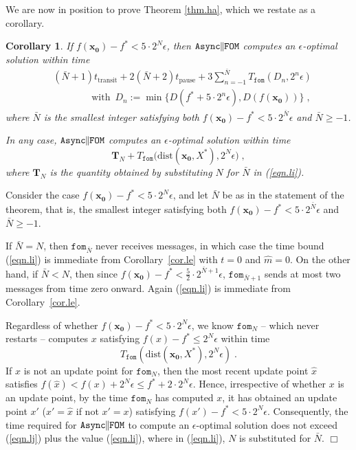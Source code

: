 \documentclass[reqno, 11pt]{amsart}
\newtheorem{cor}[prop]{Corollary}
\numberwithin{equation}{section}
\newcommand{\nt}{\negthinspace}
\newcommand{\fom}{\mathtt{fom}}
\newcommand{\parfom}{\parallel \nt \nt  \mathtt{FOM}}
\newcommand{\tpause}{t_{\mathrm{pause}}}
\newcommand{\ttransit}{t_{\mathrm{transit}}}
\newcommand{\aparfom}{\mathtt{Async} \nt \nt \parfom}
\newcommand{\dist}{\mathrm{dist}}
\begin{document}
We are now in position to prove Theorem \ref{thm.ha}, which we restate as a corollary.

\begin{cor}   \label{cor.lf} 
If $ f(\mathbf{x_0}) - f^* < 5 \cdot 2^N \epsilon $, then $ \aparfom $ computes an $ \epsilon $-optimal solution within time
\begin{align} 
  & (\bar{N}+1) \ttransit + 2(\bar{N}+2) \tpause +  3 \sum_{n=-1}^{\bar{N}}  T_{\fom}\left(   D_n , 2^n \epsilon \right)  \label{eqn.li}    \\   
& \qquad \qquad   \textrm{with } \,    D_n :=   \min \{ D(f^* + 5 \cdot 2^n \epsilon), D( f( \mathbf{x_0})) \}  \; , \nonumber 
\end{align}   
where $ \bar{N} $ is the smallest integer satisfying both $ f(\mathbf{x_0}) - f^* < 5 \cdot 2^{\bar{N}} \epsilon $ and $ \bar{N} \geq -1 $.

In any case, $ \aparfom $ computes an $ \epsilon $-optimal solution within time
\[ 
\mathbf{T}_N + 
  T_{\fom}\big( \dist( \mathbf{x_0}, X^*), 2^{N} \epsilon \big)   \; , 
\]  
 where $ \mathbf{T}_N  $ is the quantity obtained by substituting $ N $ for $ \bar{N} $ in (\ref{eqn.li}).
\end{cor}
  Consider the case $ f( \mathbf{x_0}) - f^* < 5 \cdot 2^N  \epsilon $, and let $ \bar{N} $ be as in the statement of the theorem, that is, the smallest integer satisfying both $ f( \mathbf{x_0}) - f^* < 5 \cdot 2^{\bar{N}}  \epsilon $ and $ \bar{N} \geq -1 $. 

If $ \bar{N} = N $, then $ \fom_{\bar{N}} $ never receives messages, in which case the time bound (\ref{eqn.li})   is immediate from Corollary~\ref{cor.le}  with $ t = 0 $ and $ \hat{m} = 0 $. On the other hand, if $ \bar{N} < N $, then since $ f( \mathbf{x_0}) - f^* < \frac{5}{2}  \cdot 2^{\bar{N}+1} \epsilon $, $ \fom_{\bar{N}+1} $ sends at most two messages from time zero onward. Again (\ref{eqn.li})  is immediate from Corollary~\ref{cor.le}.

Regardless of whether $  f( \mathbf{x_0}) - f^* < 5 \cdot 2^N  \epsilon $, we know $ \fom_{N} $ -- which never restarts -- computes $ x $ satisfying $ f(x) - f^* \leq 2^N \epsilon $ within time 
\begin{equation}  \label{eqn.lj} 
        T_{\fom}( \dist( \mathbf{x_0}, X^*), 2^{N}\epsilon) \; . 
        \end{equation}
If $ x $ is not an update point for $ \fom_{N} $, then the most recent update point $ \hat{x} $ satisfies $ f(\hat{x}) < f(x) + 2^{N} \epsilon \leq  f^* + 2 \cdot 2^N \epsilon $. Hence, irrespective of whether $ x $ is an update point, by the time $ \fom_{N} $ has computed $ x $, it has obtained an update point $ x' $ ($ x' = \hat{x} $ if not $ x' = x $)  satisfying $ f(x') - f^* < 5 \cdot 2^{N} \epsilon $. Consequently, the time required for $ \aparfom $ to compute an $ \epsilon$-optimal solution does not exceed (\ref{eqn.lj})   plus the value (\ref{eqn.li}), where in (\ref{eqn.li}), $ N $ is substituted for $ \bar{N} $.  \hfill $ \Box $ 
\end{document}
